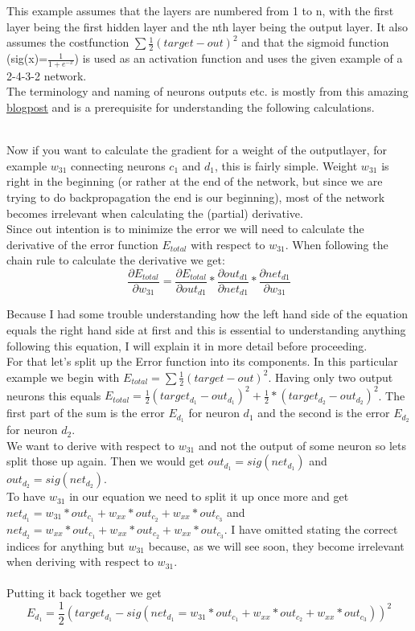 \documentclass[11pt, halfparskip]{article}
\begin{document}
\noindent This example assumes that the layers are numbered from 1 to n, with the first layer being the first hidden layer and the nth layer being the output layer.
It also assumes the costfunction $\sum \frac{1}{2}(target - out)^2$ and that the sigmoid function (sig(x)=$\frac{1}{1 + e^{-x}}$) is used as an activation function and
uses the given example of a 2-4-3-2 network.\\
The terminology and naming of neurons outputs etc. is mostly from this amazing \href{https://mattmazur.com/2015/03/17/a-step-by-step-backpropagation-example}{blogpost}
and is a prerequisite for understanding the following calculations.

\noindent\\
Now if you want to calculate the gradient for a weight of the outputlayer, for example $w_{31}$ connecting neurons $c_1$ and $d_1$, this is fairly simple. Weight
$w_{31}$ is right in the beginning (or rather at the end of the network, but since we are trying to do backpropagation the end is our beginning), most of the network
becomes irrelevant when calculating the (partial) derivative.\\
Since out intention is to minimize the error we will need to calculate the derivative of the error function $E_{total}$ with respect to $w_{31}$. When following the chain rule to calculate 
the derivative we get:
    \begin{equation}
	\frac{\partial E_{total}}{\partial w_{31}} = \frac{\partial E_{total}}{\partial out_{d1}} * \frac{\partial out_{d1}}{\partial net_{d1}} * \frac{\partial net_{d1}}{\partial w_{31}}
    \end{equation}
    
\noindent Because I had some trouble understanding how the left hand side of the equation equals the right hand side at first and this is essential to understanding anything following this
equation, I will explain it in more detail before proceeding.\\
For that let's split up the Error function into its components. In this particular example we begin with $E_{total} = \sum \frac{1}{2}(target-out)^2$. Having only two output neurons
this equals $E_{total} = \frac{1}{2}(target_{d_1} - out_{d_1})^2 + \frac{1}{2}*(target_{d_2} - out_{d_2})^2$.
The first part of the sum is the error $E_{d_1}$ for neuron $d_1$ and the second is the error $E_{d_2}$ for neuron $d_2$.\\
We want to derive with respect to $w_{31}$ and not the output of some neuron so lets split those up again. Then we would get $out_{d_1} = sig(net_{d_1})$ and 
$out_{d_2} = sig(net_{d_2})$.\\
To have $w_{31}$ in our equation we need to split it up once more and get $net_{d_1} = w_{31}*out_{c_1} + w_{xx}*out_{c_2} + w_{xx}*out_{c_3}$ and
$net_{d_2} = w_{xx}*out_{c_1} + w_{xx}*out_{c_2} + w_{xx}*out_{c_3}$. I have omitted stating the correct indices for anything but $w_{31}$ because, as we will see soon,
they become irrelevant when deriving with respect to $w_{31}$.\\

\noindent\\
Putting it back together we get
    \begin{equation}
    	E_{d_1} = \frac{1}{2}(target_{d_1} - sig(net_{d_1} = w_{31}*out_{c_1} + w_{xx}*out_{c_2} + w_{xx}*out_{c_3}))^2
    \end{equation}
    
    
    
    
\end{document}
